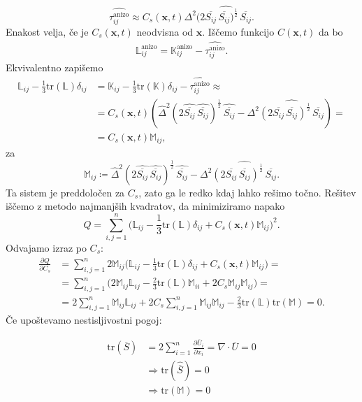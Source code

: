 \documentclass[mat2, tisk]{fmfdelo}
\newcommand{\bd}{\textbf}
\begin{document}
$$
\widehat{\tau_{ij}^\text{anizo}} \approx C_s(\bd{x}, t) \Delta^2 (\widehat{2 \overline{S_{ij}} \,\overline{S_{ij}})^\frac{1}{2} \,\overline{S_{ij}}}.
$$
Enakost velja, če je $C_s(\bd{x}, t)$ neodvisna od $\bd{x}$. 
Iščemo funkcijo $C(\bd{x}, t)$ da bo 
\begin{align*}
\mathbb{L}_{ij}^\text{anizo} = \mathbb{K}_{ij}^\text{anizo} - \widehat{\tau_{ij}^\text{anizo}}.
\end{align*}
Ekvivalentno zapišemo 
\begin{align*}
\mathbb{L}_{ij} - \frac{1}{3}\text{tr}(\mathbb{L}) \delta_{ij} &= \mathbb{K}_{ij} - \frac{1}{3}\text{tr}(\mathbb{K}) \delta_{ij} - \widehat{\tau_{ij}^\text{anizo}} \approx \\
&= C_s(\bd{x}, t)(\widehat{\Delta}^2 (2 \widehat{\overline{S_{ij}}} \,\widehat{\overline{S_{ij}}})^\frac{1}{2} \,\widehat{\overline{S_{ij}}} - \Delta^2 \widehat{(2 \overline{S_{ij}} \,\overline{S_{ij}})^\frac{1}{2} \,\overline{S_{ij}}}) = \\
&= C_s(\bd{x}, t)\mathbb{M}_{ij},
\end{align*}
za 
$$
\mathbb{M}_{ij} \coloneqq \widehat{\Delta}^2 (2 \widehat{\overline{S_{ij}}} \,\widehat{\overline{S_{ij}}})^\frac{1}{2} \,\widehat{\overline{S_{ij}}} - \Delta^2 \widehat{(2 \overline{S_{ij}} \,\overline{S_{ij}})^\frac{1}{2} \,\overline{S_{ij}}}.
$$
Ta sistem je preddoločen za $C_s$, zato ga le redko kdaj lahko rešimo točno.
Rešitev iščemo z metodo najmanjših kvadratov, da minimiziramo napako
$$
Q = \sum_{i,j=1}^n \Big(\mathbb{L}_{ij} - \frac{1}{3}\text{tr}(\mathbb{L}) \delta_{ij} + C_s(\bd{x}, t)\mathbb{M}_{ij}\Big)^2.
$$
Odvajamo izraz po $C_s$:
\begin{align*}
  \frac{\partial Q}{\partial C_s} &= \sum_{i,j=1}^n 2\mathbb{M}_{ij}\Big(\mathbb{L}_{ij} - \frac{1}{3}\text{tr}(\mathbb{L}) \delta_{ij} + C_s(\bd{x}, t)\mathbb{M}_{ij}\Big) =\\
  &= \sum_{i,j=1}^n \Big(2\mathbb{M}_{ij} \mathbb{L}_{ij} - \frac{2}{3} \text{tr}({\mathbb{L}}) \mathbb{M}_{ii} + 2C_s \mathbb{M}_{ij} \mathbb{M}_{ij}\Big)= \\
  &= 2\sum_{i,j=1}^n \mathbb{M}_{ij} \mathbb{L}_{ij} + 2C_s \sum_{i,j=1}^n \mathbb{M}_{ij} \mathbb{M}_{ij} - \frac{2}{3} \text{tr}({\mathbb{L}}) \text{tr}(\mathbb{M}) = 0.
\end{align*}
Če upoštevamo nestisljivostni pogoj: 

\begin{align*}
\text{tr}(\overline{S}) &= 2\sum_{i=1}^n \frac{\partial \overline{U}_i}{\partial x_i} = \nabla \cdot \overline{U} = 0 \\
&\Longrightarrow \text{tr}(\widehat{\overline{S}}) = 0 \\
&\Longrightarrow \text{tr}(\mathbb{M}) = 0
\end{align*}
\end{document}
